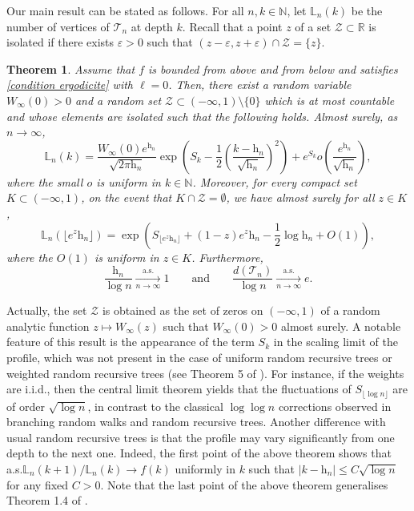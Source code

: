 \documentclass[11pt]{article}
\newtheorem{theorem}{Theorem}[section]
\numberwithin{equation}{section}
\def\vp{\varepsilon}
\def \R{\mathbb {R}}
\def \N{\mathbb{N}}
\def \T{\mathcal{T}}
\begin{document}
Our main result can be stated as follows. For all $n ,k \in \N$, let $\mathbb{L}_n(k)$ be the number of vertices of $\T_n$ at depth $k$. Recall that a point $z$ of a set $\mathcal{Z}\subset \R$ is isolated if there exists $\vp>0$ such that $(z-\vp, z+\vp) \cap \mathcal{Z}= \{z\}$.
\begin{theorem}\label{theoreme profil}
	Assume that $f$ is bounded from above and from below and satisfies \eqref{condition ergodicite} with 
	$\ell=0$. Then, there exist a random variable $W_\infty(0)>0$ and a random set $\mathcal{Z}\subset (-\infty, 1)\setminus \{0\}$ which is at most countable and whose elements are isolated such that the following holds. Almost surely, as $n\to \infty$,
	\[\mathbb{L}_n(k) = \frac{W_\infty(0)e^{\mathrm{h}_n}}{\sqrt{2\pi \mathrm{h}_n}} \exp\left(S_k- \frac{1}{2} \left(\frac{k-\mathrm{h}_n}{\sqrt{\mathrm{h}_n}}\right)^2 \right)  + e^{S_k}o\left(\frac{e^{\mathrm{h}_n}}{\sqrt{\mathrm{h}_n}} \right),\]
	where the small $o$ is uniform in $k \in \N$. Moreover, for every compact set $K \subset (-\infty,1)$, on the event that $ K \cap \mathcal{Z} = \emptyset $, we have almost surely for all $z \in K$,
	\[
	\mathbb{L}_n(\lfloor e^z \mathrm{h}_n \rfloor) = \exp\left({S_{\lfloor e^z \mathrm{h}_n \rfloor} +  (1-z)e^z \mathrm{h}_n -\frac{1}{2} \log \mathrm{h}_n + O(1) }\right),
	\]
	where the $O(1)$ is uniform in $z\in K$. Furthermore,
	\[
	\frac{\mathrm{h}_n}{\log n} \mathop{\longrightarrow}\limits_{n\to \infty}^{\mathrm{a.s.}} 1 \qquad \text{and} \qquad \frac{d(\T_n)}{\log n} \mathop{\longrightarrow}\limits_{n\to \infty}^{\mathrm{a.s.}} e.
	\]
\end{theorem}
Actually, the set $\mathcal{Z}$ is obtained as the set of zeros on $(-\infty, 1)$ of a random analytic function $z\mapsto W_\infty(z)$ such that $W_\infty(0) > 0$ almost surely. A notable feature of this result is the appearance of the term $S_k$ in the scaling limit of the profile, which was not present in the case of uniform random recursive trees or weighted random recursive trees (see Theorem 5 of \cite{Sen21}). For instance, if the weights are i.i.d.\@, then the central limit theorem yields that the fluctuations of $S_{\lfloor \log n \rfloor}$ are of order $\sqrt{\log n}$, in contrast to the classical $\log \log n$ corrections observed in branching random walks and random recursive trees. Another difference with usual random recursive trees is that the profile may vary significantly from one depth to the next one. Indeed, the first point of the above theorem shows that a.s.\@ $\mathbb{L}_n(k+1)/\mathbb{L}_n(k) \to f(k)$ uniformly in $k$ such that $\vert k - \mathrm{h}_n\vert \le C \sqrt{\log n}$ for any fixed $C>0$. Note that the last point of the above theorem generalises Theorem 1.4 of \cite{LLLM26}.
\end{document}
